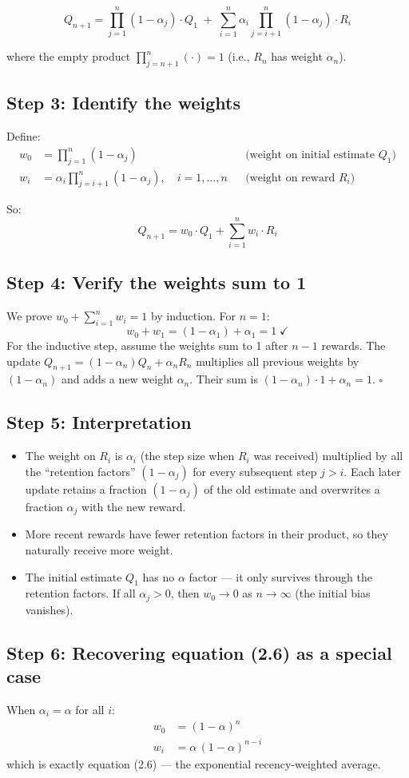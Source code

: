 \documentclass[11pt]{article}
\begin{document}
\[
    \boxed{Q_{n+1} = \prod_{j=1}^{n}(1-\alpha_j)\cdot Q_1
    \;+\; \sum_{i=1}^{n}\alpha_i \prod_{j=i+1}^{n}(1-\alpha_j)\cdot R_i}
\]

where the empty product $\prod_{j=n+1}^{n}(\cdot) = 1$ (i.e., $R_n$ has weight $\alpha_n$).

\subsection*{Step 3: Identify the weights}

Define:
\begin{align*}
    w_0 &= \prod_{j=1}^{n}(1-\alpha_j)
    & &\text{(weight on initial estimate } Q_1\text{)} \\[6pt]
    w_i &= \alpha_i \prod_{j=i+1}^{n}(1-\alpha_j), \quad i = 1, \ldots, n
    & &\text{(weight on reward } R_i\text{)}
\end{align*}

So:
\[
    Q_{n+1} = w_0 \cdot Q_1 + \sum_{i=1}^{n} w_i \cdot R_i
\]

\subsection*{Step 4: Verify the weights sum to 1}

We prove $w_0 + \sum_{i=1}^{n} w_i = 1$ by induction. For $n=1$:
\[
    w_0 + w_1 = (1-\alpha_1) + \alpha_1 = 1 \;\checkmark
\]
For the inductive step, assume the weights sum to 1 after $n-1$ rewards.
The update $Q_{n+1} = (1-\alpha_n)Q_n + \alpha_n R_n$ multiplies all previous weights
by $(1-\alpha_n)$ and adds a new weight $\alpha_n$. Their sum is
$(1-\alpha_n)\cdot 1 + \alpha_n = 1$. $\square$

\subsection*{Step 5: Interpretation}

\begin{itemize}
    \item The weight on $R_i$ is $\alpha_i$ (the step size when $R_i$ was received) multiplied by
          all the ``retention factors'' $(1-\alpha_j)$ for every subsequent step $j > i$.
          Each later update retains a fraction $(1-\alpha_j)$ of the old estimate and overwrites
          a fraction $\alpha_j$ with the new reward.
    \item More recent rewards have fewer retention factors in their product, so they
          naturally receive more weight.
    \item The initial estimate $Q_1$ has no $\alpha$ factor --- it only survives through
          the retention factors. If all $\alpha_j > 0$, then $w_0 \to 0$ as $n \to \infty$
          (the initial bias vanishes).
\end{itemize}

\subsection*{Step 6: Recovering equation (2.6) as a special case}

When $\alpha_i = \alpha$ for all $i$:
\begin{align*}
    w_0 &= (1-\alpha)^n \\
    w_i &= \alpha\,(1-\alpha)^{n-i}
\end{align*}
which is exactly equation (2.6) --- the exponential recency-weighted average.
\end{document}
